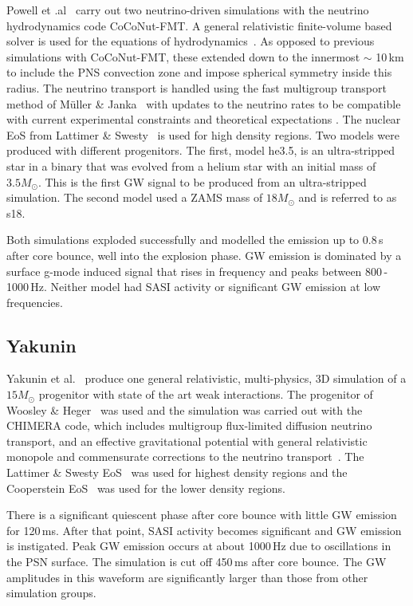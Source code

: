 Powell et .al~\cite{2018arXiv181205738P} carry out two neutrino-driven simulations with the neutrino hydrodynamics code CoCoNut-FMT. A general relativistic finite-volume based solver is used for the equations of hydrodynamics~\cite{muller2010new,dimmelmeier2002relativistic}. As opposed to previous simulations with CoCoNut-FMT, these extended down to the innermost $\sim$ 10\,km to include the PNS convection zone and impose spherical symmetry inside this radius. The neutrino transport is handled using the fast multigroup transport method of M\"uller \& Janka~\cite{muller2015non} with updates to the neutrino rates to be compatible with current experimental constraints and theoretical expectations \cite{hobbs2016role}. The nuclear EoS from Lattimer \& Swesty~\cite{lattimer1991generalized} is used for high density regions. Two models were produced with different progenitors. The first, model he3.5, is an ultra-stripped star in a binary that was evolved from a helium star with an initial mass of $3.5M_\odot$. This is the first GW signal to be produced from an ultra-stripped simulation. The second model used a ZAMS mass of $18M_\odot$ and is referred to as s18.

Both simulations exploded successfully and modelled the emission up to 0.8\,s after core bounce, well into the explosion phase. GW emission is dominated by a surface g-mode induced signal that rises in frequency and peaks between 800\,-\,1000\,Hz. Neither model had SASI activity or significant GW emission at low frequencies.

\subsection{Yakunin}

Yakunin et al.~\cite{yakunin2010gravitational, 2015PhRvD..92h4040Y, 2017arXiv170107325Y} produce one general relativistic, multi-physics, 3D simulation of a $15M_\odot$ progenitor with state of the art weak interactions. The progenitor of Woosley \& Heger~\cite{woosley2007nucleosynthesis} was used and the simulation was carried out with the CHIMERA code, which includes multigroup flux-limited diffusion neutrino transport, and an effective gravitational potential with general relativistic monopole and commensurate corrections to the neutrino transport~\cite{bruenn2016development}. The Lattimer \& Swesty EoS~\cite{lattimer1991generalized} was used for highest density regions and the Cooperstein EoS~\cite{cooperstein1985equation} was used for the lower density regions.

There is a significant quiescent phase after core bounce with little GW emission for 120\,ms. After that point, SASI activity becomes significant and GW emission is instigated. Peak GW emission occurs at about 1000\,Hz due to oscillations in the PSN surface. The simulation is cut off 450\,ms after core bounce. The GW amplitudes in this waveform are significantly larger than those from other simulation groups.

